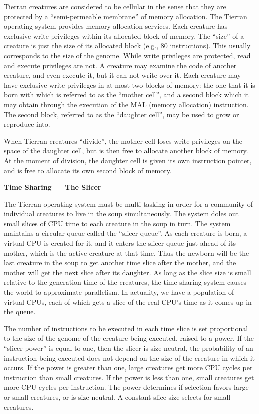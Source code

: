 Tierran creatures are considered to be cellular in the sense that they are
protected by a ``semi-permeable membrane'' of memory allocation.  The Tierran
operating system provides memory allocation services.  Each creature has
exclusive write privileges within its allocated block of memory.  The ``size''
of a creature is just the size of its allocated block (e.g., 80 instructions).
This usually corresponds to the size of the genome.
While write privileges are protected, read and execute privileges are not.
A creature may examine the code of another creature, and even execute it,
but it can not write over it.  Each creature may have exclusive write
privileges in at most two blocks of memory: the one that it is born with
which is referred to as the ``mother cell'', and a second block which it
may obtain through the execution of the MAL (memory allocation) instruction.
The second block, referred to as the ``daughter cell'', may be used to grow
or reproduce into.

When Tierran creatures ``divide'', the mother cell loses write privileges
on the space of the daughter cell, but is then free to allocate another
block of memory.  At the moment of division, the daughter cell is given
its own instruction pointer, and is free to allocate its own second block of
memory.

\LP
\bf Time Sharing --- The Slicer\rm
\eLP

The Tierran operating system must be multi-tasking in order for a community
of individual creatures to live in the soup simultaneously.  The system doles
out small slices of CPU time to each creature in the soup in turn.  The
system maintains a circular queue called the ``slicer queue''.  As each
creature is born, a virtual CPU is created for it, and it enters the slicer
queue just ahead of its mother, which is the active creature at that time.
Thus the newborn will be the last creature in the soup to get another time
slice after the mother, and the mother will get the next slice after its
daughter.  As long as the slice size is small relative to the generation
time of the creatures, the time sharing system causes the world to approximate
parallelism.  In actuality, we have a population of virtual CPUs, each of
which gets a slice of the real CPU's time as it comes up in the queue.

The number of instructions to be executed in each time slice is set
proportional to the size of the genome of the creature being executed, raised
to a power.  If the ``slicer power'' is equal to one, then the slicer is size
neutral, the probability of an instruction being executed does not depend on
the size of the creature in which it occurs.  If the power is greater than one,
large creatures get more CPU cycles per instruction than small creatures.
If the power is less than one, small creatures get more CPU cycles per
instruction.  The power determines if selection favors large or small
creatures, or is size neutral.  A constant slice size selects for small
creatures. 

